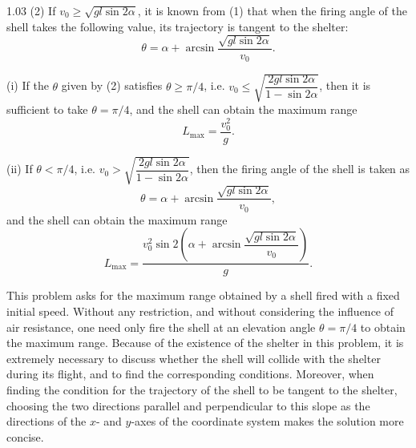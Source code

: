 \begin{solution}{1.03}
(2) If $v_0\geqslant\sqrt{gl\sin 2\alpha}$, it is known from (1) that when the firing angle of
the shell takes the following value, its trajectory is tangent to the shelter:
\begin{equation}
\theta = \alpha+\arcsin\frac{\sqrt{gl\sin 2\alpha}}{v_0}. \tag{2}
\end{equation}

(i) If the $\theta$ given by (2) satisfies $\theta\geqslant\pi/4$, i.e.
$v_0\leqslant\sqrt{\dfrac{2gl\sin 2\alpha}{1-\sin 2\alpha}}$, then it is sufficient to take
$\theta=\pi/4$, and the shell can obtain the maximum range
\begin{equation*}
L_{\max} = \frac{v_0^2}{g}.
\end{equation*}

(ii) If $\theta<\pi/4$, i.e.
$v_0>\sqrt{\dfrac{2gl\sin 2\alpha}{1-\sin 2\alpha}}$, then the firing angle of the shell is
taken as
\begin{equation*}
\theta = \alpha+\arcsin\frac{\sqrt{gl\sin 2\alpha}}{v_0},
\end{equation*}
and the shell can obtain the maximum range
\begin{equation*}
L_{\max}
= \frac{v_0^2\sin 2\left(\alpha+\arcsin\dfrac{\sqrt{gl\sin 2\alpha}}{v_0}\right)}{g}.
\end{equation*}

\begin{commentary}
This problem asks for the maximum range obtained by a shell fired with a fixed initial speed.
Without any restriction, and without considering the influence of air resistance, one need only
fire the shell at an elevation angle $\theta=\pi/4$ to obtain the maximum range. Because of the
existence of the shelter in this problem, it is extremely necessary to discuss whether the
shell will collide with the shelter during its flight, and to find the corresponding conditions.
Moreover, when finding the condition for the trajectory of the shell to be tangent to the
shelter, choosing the two directions parallel and perpendicular to this slope as the directions
of the $x$- and $y$-axes of the coordinate system makes the solution more concise.
\end{commentary}
\end{solution}

